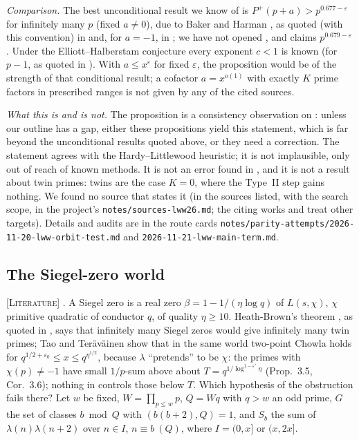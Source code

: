 \documentclass[11pt]{amsart}
\theoremstyle{definition}
\theoremstyle{remark}
\newcommand{\lbl}[1]{\textup{\textsc{[#1]}}}
\begin{document}
\emph{Comparison.} The best unconditional result we know of is
$P^+(p+a)>p^{0.677-\varepsilon}$ for infinitely many $p$ (fixed $a\ne0$), due to
Baker and Harman \cite{BH98}, as quoted (with this convention) in
\cite[pp.~1--2]{Li25} and, for $a=-1$, in \cite[p.~2]{Din25}; we have not opened
\cite{BH98}, and \cite{Li25} claims $p^{0.679-\varepsilon}$. Under the
Elliott--Halberstam conjecture every exponent $c<1$ is known (for $p-1$, as
quoted in \cite[p.~2]{Din25}). With $a\le x^{\varepsilon}$ for fixed
$\varepsilon$, the proposition would be of the strength of that conditional
result; a cofactor $a=x^{o(1)}$ with exactly $K$ prime factors in prescribed
ranges is not given by any of the cited sources.

\emph{What this is and is not.} The proposition is a consistency observation
on \cite[Props.~4.2 and 5.3]{LWW26}: unless our outline has a gap, either these
propositions yield this statement, which is far beyond the unconditional
results quoted above, or they need a correction. The statement agrees with the
Hardy--Littlewood heuristic; it is not implausible, only out of reach of known
methods. It is not an error found in \cite{LWW26}, and it is not a result about
twin primes: twins are the case $K=0$, where the Type~II step gains nothing. We
found no source that states it (in the sources listed, with the search scope,
in the project's \texttt{notes/sources-lww26.md}; the citing works
\cite{HLWW26} and \cite{Wan26} treat other targets). Details and audits are in
the route cards \texttt{notes/}\allowbreak\texttt{parity-attempts/}\allowbreak\texttt{2026-11-20-lww-orbit-test.md}
and \texttt{2026-11-21-lww-main-term.md}.

\subsection{The Siegel-zero world}\label{sec:siegel}
\begin{sloppypar}
\lbl{Literature} \cite[Definition~1.4, Theorem~1.5, Corollaries~1.8, 3.6]{TT22}.
A Siegel zero is a real zero $\beta=1-1/(\eta\log q)$ of $L(s,\chi)$, $\chi$
primitive quadratic of conductor $q$, of quality $\eta\ge10$. Heath-Brown's
theorem \cite{HB83}, as quoted in \cite[Theorem~1.5(i)]{TT22}, says that
infinitely many Siegel zeros would give infinitely many twin primes; Tao and
Ter\"av\"ainen show that in the same world two-point Chowla holds for
$q^{1/2+\varepsilon_0}\le x\le q^{\eta^{1/2}}$, because $\lambda$ ``pretends'' to be
$\chi$: the primes with $\chi(p)\ne-1$ have small $1/p$-sum above about
$T=q^{1/\log^{1-\varepsilon'}\eta}$ (Prop.~3.5, Cor.~3.6); nothing in \cite{TT22}
controls those below $T$. Which hypothesis of the obstruction fails there? Let
$w$ be fixed, $W=\prod_{p\le w}p$, $Q=Wq$ with $q>w$ an odd prime, $G$ the set of classes
$b\bmod Q$ with $(b(b+2),Q)=1$, and $S_b$ the sum of $\lambda(n)\lambda(n+2)$ over
$n\in I$, $n\equiv b\ (Q)$, where $I=(0,x]$ or $(x,2x]$.
\end{sloppypar}
\end{document}
